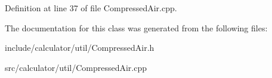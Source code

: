Definition at line 37 of file Compressed\+Air.\+cpp.



The documentation for this class was generated from the following files\+:\begin{DoxyCompactItemize}
\item 
include/calculator/util/Compressed\+Air.\+h\item 
src/calculator/util/Compressed\+Air.\+cpp\end{DoxyCompactItemize}
